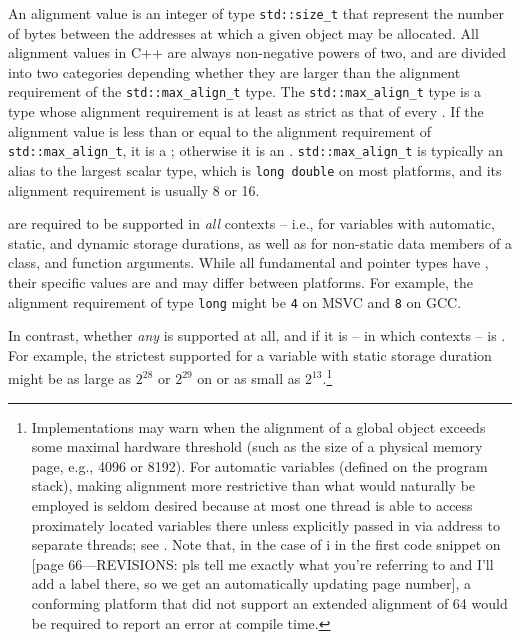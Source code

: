 An alignment value is an integer of type \lstinline!std::size_t! that represent the number of bytes between the addresses at which a given object may be allocated.  All alignment values in C++ are always non-negative powers of two, and are divided into two categories depending whether they are larger than the alignment requirement of the \lstinline!std::max_align_t! type.  The \lstinline!std::max_align_t! type is a type whose alignment requirement is at least as strict as that of every .  If the alignment value is less than or equal to the alignment requirement of \lstinline!std::max_align_t!, it is a ; otherwise it is an .  \lstinline!std::max_align_t! is typically an alias to the largest scalar type, which is \lstinline!long double! on most platforms, and its alignment requirement is usually 8 or 16.

 are required to be supported in \emph{all} contexts -- i.e., for variables with automatic, static, and dynamic storage durations, as well as for non-static data members of a class, and function arguments.  While all fundamental and pointer types have , their specific values are  and may differ between platforms.  For example, the alignment requirement of type \lstinline!long! might be \lstinline!4! on MSVC and \lstinline!8! on GCC.

In contrast, whether \emph{any}  is supported at all, and if it is -- in which contexts -- is . For example, the strictest supported  for a variable with static storage duration might be as large as $2^{28}$ or $2^{29}$ on or as small as $2^{13}$.\footnote{Implementations may warn when the alignment of a global object exceeds some maximal hardware threshold (such as the size of a physical memory page, e.g., 4096 or 8192).  For automatic variables (defined on the program stack), making alignment more restrictive than what would naturally be employed is seldom desired because at most one thread is able to access proximately located variables there unless explicitly passed in via address to separate threads; see . Note that, in the case of i in the first code snippet on \pageref{}
[page 66---REVISIONS: pls tell me exactly what you're referring to and I'll add a label there, so we get an automatically updating page number], a conforming platform that did not support an extended alignment of 64 would be required to report an error at compile time.}

